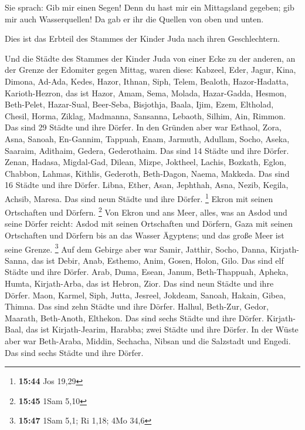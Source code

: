  Sie sprach: Gib mir einen Segen! Denn du hast mir ein
Mittagsland gegeben; gib mir auch Wasserquellen! Da gab er ihr die
Quellen von oben und unten.

 Dies ist das Erbteil des Stammes der Kinder Juda nach
ihren Geschlechtern.

 Und die Städte des Stammes der Kinder Juda von einer Ecke
zu der anderen, an der Grenze der Edomiter gegen Mittag, waren diese:
Kabzeel, Eder, Jagur,  Kina, Dimona, Ad-Ada, 
Kedes, Hazor, Ithnan,  Siph, Telem, Bealoth, 
Hazor-Hadatta, Karioth-Hezron, das ist Hazor,  Amam, Sema,
Molada,  Hazar-Gadda, Hesmon, Beth-Pelet, 
Hazar-Sual, Beer-Seba, Bisjothja,  Baala, Ijim, Ezem,
 Eltholad, Chesil, Horma,  Ziklag, Madmanna,
Sansanna,  Lebaoth, Silhim, Ain, Rimmon. Das sind 29 Städte
und ihre Dörfer.  In den Gründen aber war Esthaol, Zora,
Asna,  Sanoah, En-Gannim, Tappuah, Enam, 
Jarmuth, Adullam, Socho, Aseka,  Saaraim, Adithaim, Gedera,
Gederothaim. Das sind 14 Städte und ihre Dörfer.  Zenan,
Hadasa, Migdal-Gad,  Dilean, Mizpe, Joktheel, 
Lachis, Bozkath, Eglon,  Chabbon, Lahmas, Kithlis,
 Gederoth, Beth-Dagon, Naema, Makkeda. Das sind 16 Städte
und ihre Dörfer.  Libna, Ether, Asan, 
Jephthah, Asna, Nezib,  Kegila, Achsib, Maresa. Das sind
neun Städte und ihre Dörfer. \footnote{\textbf{15:44} Jos 19,29}
 Ekron mit seinen Ortschaften und Dörfern. \footnote{\textbf{15:45}
  1Sam 5,10}  Von Ekron und ans Meer, alles, was an Asdod
und seine Dörfer reicht:  Asdod mit seinen Ortschaften und
Dörfern, Gaza mit seinen Ortschaften und Dörfern bis an das Wasser
Ägyptens; und das große Meer ist seine Grenze. \footnote{\textbf{15:47}
  1Sam 5,1; Ri 1,18; 4Mo 34,6}  Auf dem Gebirge aber war
Samir, Jatthir, Socho,  Danna, Kirjath-Sanna, das ist
Debir,  Anab, Esthemo, Anim,  Gosen, Holon,
Gilo. Das sind elf Städte und ihre Dörfer.  Arab, Duma,
Esean,  Janum, Beth-Thappuah, Apheka,  Humta,
Kirjath-Arba, das ist Hebron, Zior. Das sind neun Städte und ihre
Dörfer.  Maon, Karmel, Siph, Jutta,  Jesreel,
Jokdeam, Sanoah,  Hakain, Gibea, Thimna. Das sind zehn
Städte und ihre Dörfer.  Halhul, Beth-Zur, Gedor,
 Maarath, Beth-Anoth, Elthekon. Das sind sechs Städte und
ihre Dörfer.  Kirjath-Baal, das ist Kirjath-Jearim,
Harabba; zwei Städte und ihre Dörfer.  In der Wüste aber
war Beth-Araba, Middin, Sechacha,  Nibsan und die Salzstadt
und Engedi. Das sind sechs Städte und ihre Dörfer.

